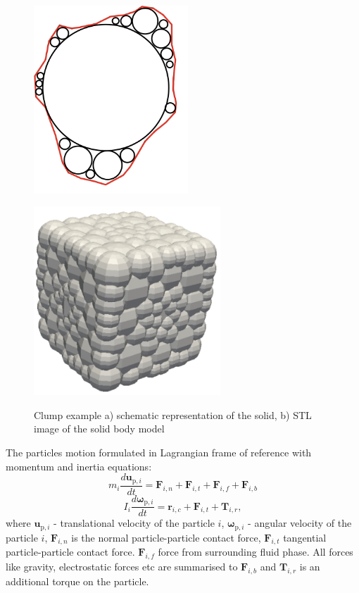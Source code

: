 \begin{figure}[!htp]
\centering
\parbox{7cm}{
\includegraphics[width=5.8cm]{Images/clump1.png}
\subcaption{}
\label{fig:3figsA}}
\qquad
\begin{minipage}{7cm}
\includegraphics[width=7cm]{Images/clump2.png}
\subcaption{}
\label{fig:3figsB}
\end{minipage}
\caption{Clump example a) schematic representation of the solid, b) STL image of the solid body model}
\end{figure}
The particles motion formulated in Lagrangian frame of reference \cite{cundall1979discrete} with momentum and inertia equations:
\begin{equation}\label{solid_body_force}
m_{i} \frac{d \boldsymbol{u}_{\mathrm{p}, i}}{d t}= \mathbf{F}_{i,n} + \mathbf{F}_{i,t} + \mathbf{F}_{i,f} + \mathbf{F}_{i,b}
\end{equation}
\begin{equation}
I_{i} \frac{d \boldsymbol{\omega}_{\mathrm{p}, i}}{d t}= \mathbf{r}_{i,c}+\mathbf{F}_{i,t}+\mathbf{T}_{i,r},
\end{equation}
where $\mathbf{u}_{\mathrm{p}, i}$ - translational velocity of the particle $i$, $\boldsymbol{\omega}_{\mathrm{p}, i}$ - angular velocity of the particle $i$, $\mathbf{F}_{i,n}$ is the normal particle-particle contact force, $\mathbf{F}_{i,t}$ tangential particle-particle contact force. $\mathbf{F}_{i,f}$ force from surrounding fluid phase. All forces like gravity, electrostatic forces etc are summarised to $\mathbf{F}_{i,b}$ and $\mathbf{T}_{i,r}$ is an additional torque on the particle.


